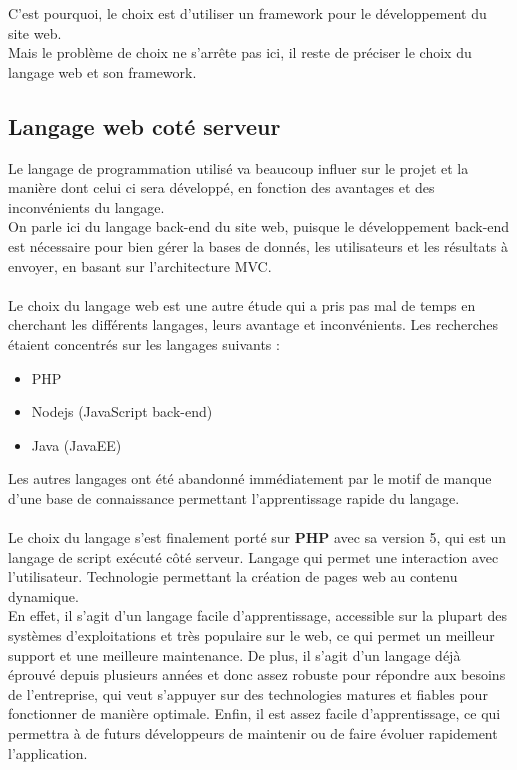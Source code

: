 \documentclass[12pt]{article}
\begin{document}
C'est pourquoi, le choix est d'utiliser un framework pour le développement du site web.\\

Mais le problème de choix ne s’arrête pas ici, il reste de préciser le choix du langage web et son framework.
 
\subsection{Langage web coté serveur }
Le langage de programmation utilisé va beaucoup influer sur le projet et la manière dont celui ci sera développé, en fonction des avantages et des inconvénients du langage.\\
On parle ici du langage back-end du site web, puisque le développement back-end est nécessaire pour bien gérer 
la bases de donnés, les  utilisateurs et les résultats à envoyer, en basant sur l'architecture MVC.\\ \\
Le choix du langage web est une autre étude qui a pris pas mal de temps en cherchant les différents langages, leurs  avantage et inconvénients. Les recherches étaient concentrés sur les langages suivants :
\begin{itemize}
\item PHP
\item Nodejs (JavaScript back-end)
\item Java (JavaEE)

\end{itemize}

Les autres langages ont été abandonné immédiatement par le motif de manque d'une base de connaissance permettant
l'apprentissage rapide du langage.\\ \\

Le choix du langage s’est finalement porté sur \textbf{PHP} avec sa version 5, qui 
 est un langage de script exécuté côté serveur. Langage qui permet une interaction avec l’utilisateur. Technologie permettant la création de pages web au contenu dynamique.\\

 En effet, il s’agit d’un langage facile
d’apprentissage, accessible sur la plupart des systèmes d’exploitations et très populaire sur le
web, ce qui permet un meilleur support et une meilleure maintenance. De plus, il s’agit d’un
langage déjà éprouvé depuis plusieurs années et donc assez robuste pour répondre aux
besoins de l’entreprise, qui veut s’appuyer sur des technologies matures et fiables pour
fonctionner de manière optimale. Enfin, il est assez facile d’apprentissage, ce qui permettra à
de futurs développeurs de maintenir ou de faire évoluer rapidement l’application.\\  \\
\end{document}
